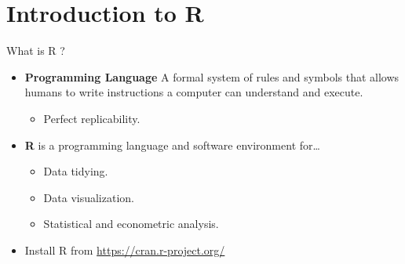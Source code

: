 \documentclass[9pt,aspectratio=169]{beamer}
\begin{document}
\section{Introduction to R}


\begin{frame}{What is R ?}

\begin{itemize}
    \item \textbf{Programming Language} A formal system of rules and symbols that allows humans to write instructions a computer can understand and execute.
    \begin{itemize}
      \item Perfect replicability.
    \end{itemize}
    \item \textbf{R} is a programming language and software environment for\dots
    \begin{itemize}
      \item Data tidying.
      \item Data visualization.
      \item Statistical and econometric analysis.
    \end{itemize}
    \item Install R from \url{https://cran.r-project.org/}
\end{itemize}
\end{frame}
\end{document}
